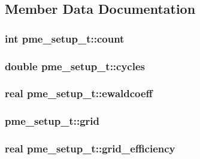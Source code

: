\subsection{\-Member \-Data \-Documentation}
\hypertarget{structpme__setup__t_a3b42714e7433639d924b45d6ee89dffa}{
\subsubsection[{count}]{\setlength{\rightskip}{0pt plus 5cm}int {\bf pme\-\_\-setup\-\_\-t\-::count}}}\label{structpme__setup__t_a3b42714e7433639d924b45d6ee89dffa}
\hypertarget{structpme__setup__t_a6dcf8a73c5f07dff8afa7371cef87bd9}{
\subsubsection[{cycles}]{\setlength{\rightskip}{0pt plus 5cm}double {\bf pme\-\_\-setup\-\_\-t\-::cycles}}}\label{structpme__setup__t_a6dcf8a73c5f07dff8afa7371cef87bd9}
\hypertarget{structpme__setup__t_ac084e20c11e6a5f8f99ca2f06e99cc87}{
\subsubsection[{ewaldcoeff}]{\setlength{\rightskip}{0pt plus 5cm}real {\bf pme\-\_\-setup\-\_\-t\-::ewaldcoeff}}}\label{structpme__setup__t_ac084e20c11e6a5f8f99ca2f06e99cc87}
\hypertarget{structpme__setup__t_a802011c5154d75f85f8350703a3cc57a}{
\subsubsection[{grid}]{ {\bf pme\-\_\-setup\-\_\-t\-::grid}}}\label{structpme__setup__t_a802011c5154d75f85f8350703a3cc57a}
\hypertarget{structpme__setup__t_af9bc7fe8d120a9ce09fb34dbb13c5e02}{
\subsubsection[{grid\-\_\-efficiency}]{\setlength{\rightskip}{0pt plus 5cm}real {\bf pme\-\_\-setup\-\_\-t\-::grid\-\_\-efficiency}}}\label{structpme__setup__t_af9bc7fe8d120a9ce09fb34dbb13c5e02}
